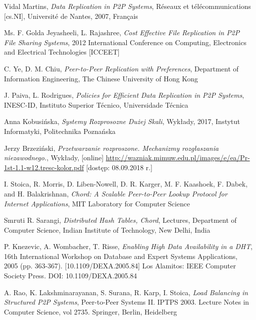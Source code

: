 \documentclass[12pt, twoside, openany]{report}
\begin{document}

\begin{thebibliography}{11}

 Vidal Martins, \emph{Data Replication in P2P Systems}, Réseaux et télécommunications [cs.NI], Université de Nantes, 2007, Français

 Ms. F. Golda Jeyasheeli, L. Rajashree, \emph{Cost Effective File Replication in P2P File Sharing Systems}, 2012 International Conference on Computing, Electronics and Electrical Technologies [ICCEET]
 
 C. Ye, D. M. Chiu, \emph{Peer-to-Peer Replication with Preferences}, Department of Information Engineering, The Chinese University of Hong Kong

 J. Paiva, L. Rodrigues, \emph{Policies for Efficient Data Replication in P2P Systems}, INESC-ID, Instituto Superior Técnico, Universidade Técnica

 Anna Kobusińska, \emph{Systemy Rozprosozne Dużej Skali}, Wykłady, 2017, Instytut Informatyki, Politechnika Poznańska

 Jerzy Brzeziński, \emph{Przetwarzanie rozproszone. Mechanizmy rozgłaszania niezawodnego.}, Wykłady, [online] \url{http://wazniak.mimuw.edu.pl/images/e/ea/Pr-1st-1.1-w12.tresc-kolor.pdf} [dostęp: 08.09.2018 r.]

  I. Stoica, R. Morris, D. Liben-Nowell, D. R. Karger, M. F. Kaashoek, F. Dabek, and H. Balakrishnan, \emph{Chord: A Scalable Peer-to-Peer Lookup Protocol for Internet Applications}, MIT Laboratory for Computer Science

 Smruti R. Sarangi, \emph{Distributed Hash Tables, Chord}, Lectures, Department of Computer Science, Indian Institute of Technology, New Delhi, India

 P. Knezevic, A. Wombacher, T. Risse, \emph{Enabling High Data Availability in a DHT}, 16th International Workshop on Database and Expert Systems Applications, 2005 (pp. 363-367). [10.1109/DEXA.2005.84] Los Alamitos: IEEE Computer Society Press. DOI: 10.1109/DEXA.2005.84

 A. Rao, K. Lakshminarayanan, S. Surana, R. Karp, I. Stoica, \emph{Load Balancing in Structured P2P Systems}, Peer-to-Peer Systems II. IPTPS 2003. Lecture Notes in Computer Science, vol 2735. Springer, Berlin, Heidelberg


\end{thebibliography}
\end{document}
